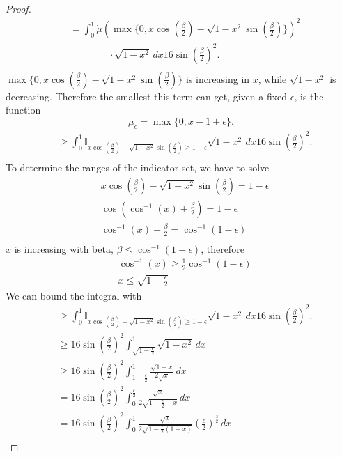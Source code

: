 \documentclass[twoside]{article} \usepackage{aistats2017}
\begin{document}
\begin{proof}
\begin{align*}
        &=\int_{0}^{1}\dot{\mu}\left(\max\{0,x\cos(\frac{\beta}{2})-\sqrt{1-x^2}\sin(\frac{\beta}{2})\} \right)^2\\
        &\qquad\qquad\cdot  \sqrt{1-x^2}\, dx16\sin(\frac{\beta}{2})^2.\\
    \end{align*}
    $\max\{0,x\cos(\frac{\beta}{2})-\sqrt{1-x^2}\sin(\frac{\beta}{2})\}$ is increasing in $x$, while $\sqrt{1-x^2}$ is decreasing. Therefore the smallest this term can get, given a fixed $\epsilon$, is the function 
    $$\mu_\epsilon = \max\{0,x-1+\epsilon\}.$$
    \begin{align*}
        &\geq\int_{0}^{1}\mathbb{I}_{x\cos(\frac{\beta}{2})-\sqrt{1-x^2}\sin(\frac{\beta}{2})\geq 1-\epsilon}\sqrt{1-x^2}\, dx16\sin(\frac{\beta}{2})^2.\\
    \end{align*}
    To determine the ranges of the indicator set, we have to solve
    \begin{align*}
        &x\cos(\frac{\beta}{2})-\sqrt{1-x^2}\sin(\frac{\beta}{2})= 1-\epsilon\\
        &\cos(\cos^{-1}(x)+\frac{\beta}{2})= 1-\epsilon\\
        &\cos^{-1}(x)+\frac{\beta}{2}= \cos^{-1}(1-\epsilon)\\
    \end{align*}
    $x$ is increasing with beta, $\beta\leq \cos^{-1}(1-\epsilon)$, therefore
    \begin{align*}
    &\cos^{-1}(x)\geq \frac{1}{2}\cos^{-1}(1-\epsilon)\\
    &x \leq \sqrt{1-\frac{\epsilon}{2}}
    \end{align*}
    We can bound the integral with
    \begin{align*}
        &\geq\int_{0}^{1}\mathbb{I}_{x\cos(\frac{\beta}{2})-\sqrt{1-x^2}\sin(\frac{\beta}{2})\geq 1-\epsilon}\sqrt{1-x^2}\, dx16\sin(\frac{\beta}{2})^2.\\
        &\geq 16\sin(\frac{\beta}{2})^2\int_{\sqrt{1-\frac{\epsilon}{2}}}^1\sqrt{1-x^2}\,dx\\
        &\geq 16\sin(\frac{\beta}{2})^2\int_{1-\frac{\epsilon}{2}}^1\frac{\sqrt{1-x}}{2\sqrt{x}}\,dx\\
        &= 16\sin(\frac{\beta}{2})^2\int_{0}^{\frac{\epsilon}{2}}\frac{\sqrt{x}}{2\sqrt{1-\frac{\epsilon}{2}+x}}\,dx\\
        &= 16\sin(\frac{\beta}{2})^2\int_{0}^{1}\frac{\sqrt{x}}{2\sqrt{1-\frac{\epsilon}{2}(1-x)}}(\frac{\epsilon}{2})^{\frac{3}{2}}\,dx\\

\end{align*}
\end{proof}
\end{document}

